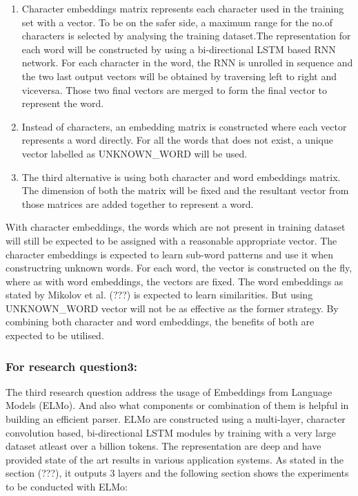 \documentclass[a4paper, 11pt]{article}
\begin{document}
\begin{enumerate}
\item Character embeddings matrix represents each character used in the training set with a vector. To be on the safer side, a maximum range for the no.of characters is selected by analysing the training dataset.The representation for each word will be constructed by using a bi-directional LSTM based RNN network. For each character in the word, the RNN is unrolled in sequence and the two last output vectors will be obtained by traversing left to right and viceversa. Those two final vectors are merged to form the final vector to represent the word.
\item Instead of characters, an embedding matrix is constructed where each vector represents a word directly. For all the words that does not exist, a unique vector labelled as UNKNOWN\_WORD will be used. 
\item The third alternative is using both character and word embeddings matrix. The dimension of both the matrix will be fixed and the resultant vector from those matrices  are added together to represent a word. 
\end{enumerate}

With character embeddings, the words which are not present in training dataset will still be expected to be assigned with a reasonable appropriate vector. The character embeddings is expected to learn sub-word patterns and use it when constructring unknown words. For each word, the vector is constructed on the fly, where as with word embeddings, the vectors are fixed. The word embeddings as stated by Mikolov et al. (???) is expected to learn similarities. But using UNKNOWN\_WORD vector will not be as effective as the former strategy. By combining both character and word embeddings, the benefits of both are expected to be utilised. 
\subsubsection{For research question3:}

The third research question address the usage of Embeddings from Language Models (ELMo). And also what components or combination of them is helpful in building an efficient parser. ELMo are constructed using a multi-layer, character convolution based, bi-directional LSTM modules by training with a very large dataset atleast over a billion tokens. The representation are deep and have provided state of the art results in various application systems. As stated in the section (???), it outputs 3 layers and the following section shows the experiments to be conducted with ELMo:
\end{document}
